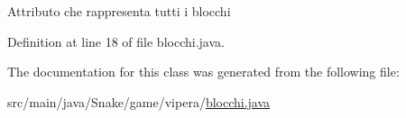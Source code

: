 Attributo che rappresenta tutti i blocchi 

Definition at line 18 of file blocchi.\+java.



The documentation for this class was generated from the following file\+:\begin{DoxyCompactItemize}
\item 
src/main/java/\+Snake/game/vipera/\mbox{\hyperlink{blocchi_8java}{blocchi.\+java}}\end{DoxyCompactItemize}
